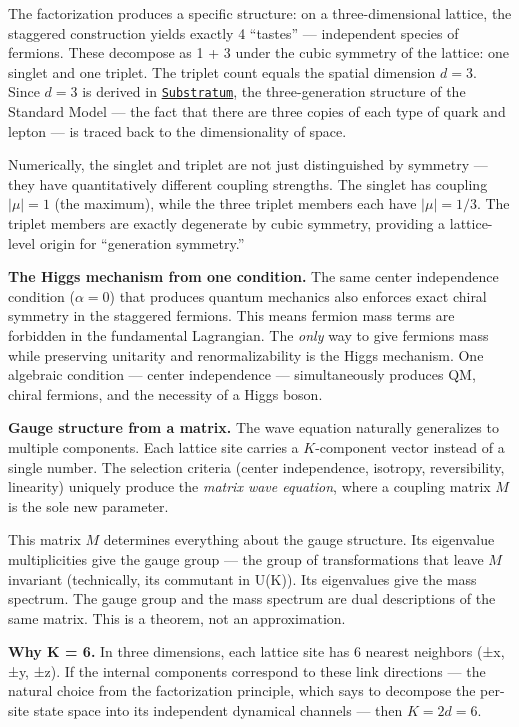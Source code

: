 \documentclass[
]{article}
\begin{document}
The factorization produces a specific structure: on a three-dimensional
lattice, the staggered construction yields exactly 4 ``tastes'' ---
independent species of fermions. These decompose as 1 + 3 under the
cubic symmetry of the lattice: one singlet and one triplet. The triplet
count equals the spatial dimension \(d = 3\). Since \(d = 3\) is derived
in \href{Substratum.md}{\texttt{Substratum}}, the three-generation
structure of the Standard Model --- the fact that there are three copies
of each type of quark and lepton --- is traced back to the
dimensionality of space.

Numerically, the singlet and triplet are not just distinguished by
symmetry --- they have quantitatively different coupling strengths. The
singlet has coupling \(|\mu| = 1\) (the maximum), while the three
triplet members each have \(|\mu| = 1/3\). The triplet members are
exactly degenerate by cubic symmetry, providing a lattice-level origin
for ``generation symmetry.''

\textbf{The Higgs mechanism from one condition.} The same center
independence condition (\(\alpha = 0\)) that produces quantum mechanics
also enforces exact chiral symmetry in the staggered fermions. This
means fermion mass terms are forbidden in the fundamental Lagrangian.
The \emph{only} way to give fermions mass while preserving unitarity and
renormalizability is the Higgs mechanism. One algebraic condition ---
center independence --- simultaneously produces QM, chiral fermions, and
the necessity of a Higgs boson.

\textbf{Gauge structure from a matrix.} The wave equation naturally
generalizes to multiple components. Each lattice site carries a
\(K\)-component vector instead of a single number. The selection
criteria (center independence, isotropy, reversibility, linearity)
uniquely produce the \emph{matrix wave equation}, where a coupling
matrix \(M\) is the sole new parameter.

This matrix \(M\) determines everything about the gauge structure. Its
eigenvalue multiplicities give the gauge group --- the group of
transformations that leave \(M\) invariant (technically, its commutant
in U(K)). Its eigenvalues give the mass spectrum. The gauge group and
the mass spectrum are dual descriptions of the same matrix. This is a
theorem, not an approximation.

\textbf{Why K = 6.} In three dimensions, each lattice site has 6 nearest
neighbors (±x, ±y, ±z). If the internal components correspond to these
link directions --- the natural choice from the factorization principle,
which says to decompose the per-site state space into its independent
dynamical channels --- then \(K = 2d = 6\).
\end{document}
